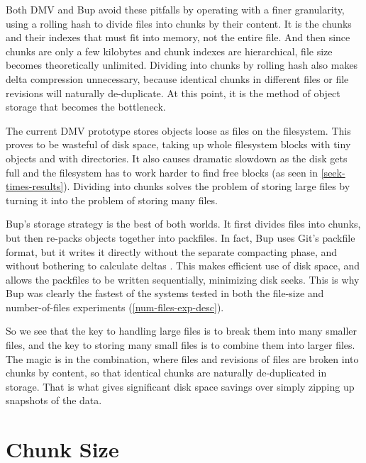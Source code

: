 Both \gls{DMV} and Bup avoid these pitfalls by operating with a finer
granularity, using a rolling hash to divide files into chunks by their content.
It is the chunks and their indexes that must fit into memory, not the entire
file. And then since chunks are only a few kilobytes and chunk indexes are
hierarchical, file size becomes theoretically unlimited. Dividing into chunks by
rolling hash also makes delta compression unnecessary, because identical chunks
in different files or file revisions will naturally de-duplicate. At this point,
it is the method of object storage that becomes the bottleneck.

The current \gls{DMV} prototype stores objects loose as files on the filesystem.
This proves to be wasteful of disk space, taking up whole filesystem blocks with
tiny objects and with directories. It also causes dramatic slowdown as the disk
gets full and the filesystem has to work harder to find free blocks (as seen in
\autoref{seek-times-results}). Dividing into chunks solves the problem of
storing large files by turning it into the problem of storing many files.

Bup's storage strategy is the best of both worlds. It first divides files into
chunks, but then re-packs objects together into \glspl{packfile}. In fact, Bup
uses Git's \gls{packfile} format\footnotemark, but it writes it directly without
the separate compacting phase, and without bothering to calculate deltas
\cite{bup_design}. This makes efficient use of disk space, and allows the
\glspl{packfile} to be written sequentially, minimizing disk seeks. This is why
Bup was clearly the fastest of the systems tested in both the file-size and
number-of-files experiments (\autoref{num-files-exp-desc}).


So we see that the key to handling large files is to break them into many
smaller files, and the key to storing many small files is to combine them into
larger files. The magic is in the combination, where files and revisions of
files are broken into chunks by content, so that identical chunks are naturally
de-duplicated in storage. That is what gives significant disk space savings over
simply zipping up snapshots of the data.

%


\section{Chunk Size}

